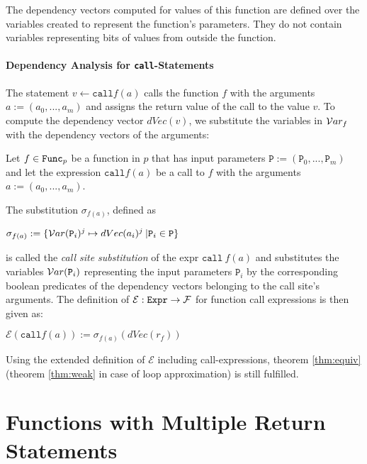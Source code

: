 The dependency vectors computed for values of this function are defined over the variables created to represent the function's parameters. They do not contain variables representing bits of values from outside the function.

\paragraph{Dependency Analysis for \texttt{call}-Statements}
The statement $v \leftarrow \mathtt{call} f(a)$ calls the function $f$ with the arguments $a := (a_0,..., a_m)$ and assigns the return value of the call to the value $v$. To compute the dependency vector $dVec(v)$, we substitute the variables in $\mathcal{V}ar_f$ with the dependency vectors of the arguments:

\begin{definition}\label{def:callsiteSub}
    Let $f \in \mathtt{Func}_p$ be a function in $p$ that has input parameters $\mathtt{P} := (\mathtt{P}_0,...,\mathtt{P}_m)$ and let the expression $\mathtt{call} f(a)$ be a call to $f$ with the arguments $a := (a_0,..., a_m)$.
    
    The substitution $\sigma_{f(a)}$, defined as
    \begin{center}
        $\sigma_{f(a)} := \{ \mathcal{V}ar(\mathtt{P}_i)^j \mapsto dVec(a_i)^j \: |  \mathtt{P}_i \in \mathtt{P}\}$
    \end{center}
    is called the \emph{call site substitution} of the expr $\mathtt{call} \: f(a)$ and substitutes the variables $\mathcal{V}ar(\mathtt{P}_i)$ representing the input parameters $\mathtt{P}_i$ by the corresponding boolean predicates of the dependency vectors belonging to the call site's arguments.
    The definition of $\mathcal{E}: \mathtt{Expr} \to \mathcal{F}$ for function call expressions is then given as:
    \begin{center}
        $\mathcal{E}(\mathtt{call} f(a)) := \sigma_{f(a)} (dVec(r_f))$
    \end{center}
\end{definition}

\begin{lemma}
Using the extended definition of $\mathcal{E}$ including call-expressions, theorem \ref{thm:equiv} (theorem \ref{thm:weak} in case of loop approximation) is still fulfilled.
\end{lemma}

\section{Functions with Multiple Return Statements}

